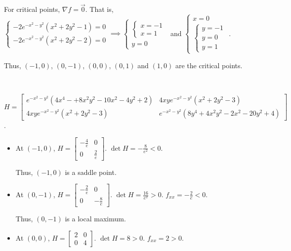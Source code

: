 \documentclass[11pt,fleqn]{book} %
\begin{document}
\begin{enumerate}
    For critical points, $\nabla f = \vec{0}$. That is, $\begin{cases} -2e^{-x^2-y^2} (x^2 + 2y^2 - 1) = 0 \\ -2e^{-x^2-y^2} (x^2 + 2y^2 - 2) = 0 \end{cases} \implies \begin{cases} \begin{cases} x = -1 \\ x = 1 \end{cases} \\ y = 0 \end{cases}$ and $\begin{cases} x = 0 \\ \begin{cases} y = -1 \\ y = 0 \\ y = 1 \end{cases} \end{cases}$.

    Thus, $(-1, 0)$, $(0, -1)$, $(0, 0)$, $(0, 1)$ and $(1, 0)$ are the critical points. 

    {~~~}

    $H = \begin{bmatrix} e^{-x^2-y^2} (4x^4 - + 8x^2y^2 - 10x^2 - 4y^2 + 2) & 4xye^{-x^2-y^2}(x^2 + 2y^2 - 3) \\ 4xye^{-x^2-y^2} (x^2 + 2y^2 - 3) & e^{-x^2-y^2} (8y^4 + 4x^2y^2 - 2x^2 - 20y^2 + 4) \end{bmatrix}$. 

    \begin{itemize}
        \item At $(-1, 0)$, $H = \begin{bmatrix} -\frac{4}{e} & 0 \\ 0 & \frac{2}{e} \end{bmatrix}$. $\det H = -\frac{8}{e^2} < 0$. 
        
        Thus, $(-1, 0)$ is a saddle point. 

        \item At $(0, -1)$, $H = \begin{bmatrix} -\frac{2}{e} & 0 \\ 0 & -\frac{8}{e} \end{bmatrix}$. $\det H = \frac{16}{e^2} > 0$. $f_{xx} = -\frac{2}{e} < 0$. 
        
        Thus, $(0, -1)$ is a local maximum. 

        \item At $(0, 0)$, $H = \begin{bmatrix} 2 & 0 \\ 0 & 4 \end{bmatrix}$. $\det H = 8 > 0$. $f_{xx} = 2 > 0$. 
        

\end{itemize}
\end{enumerate}
\end{document}
